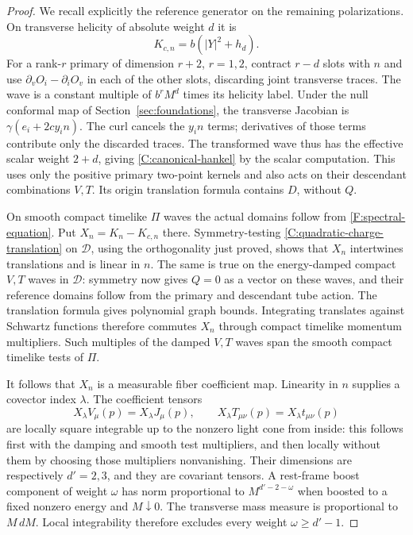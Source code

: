 \begin{proof}
We recall explicitly the reference generator on the remaining
polarizations. On transverse helicity of absolute weight $d$
it is
\begin{equation}\label{C:canonical-hankel}
 K_{c,n}=b(|Y|^2+h_d).
\end{equation}
For a rank-$r$ primary of dimension $r+2$, $r=1,2$, contract
$r-d$ slots with $n$ and use
$\partial_vO_i-\partial_iO_v$ in each of the other slots,
discarding joint transverse traces. The wave is a constant
multiple of $b^rM^d$ times its helicity label. Under the null
conformal map of Section~\ref{sec:foundations}, the transverse
Jacobian is $\gamma(e_i+2cy_i n)$. The curl cancels the
$y_i n$ terms; derivatives of those terms contribute only
the discarded traces. The transformed wave thus has the
effective scalar weight $2+d$, giving
\eqref{C:canonical-hankel} by the scalar computation. This
uses only the positive primary two-point kernels and also
acts on their descendant combinations $V,T$. Its origin
translation formula contains $D$, without $Q$.

On smooth compact timelike $\Pi$ waves the actual domains follow
from \eqref{F:spectral-equation}. Put
$X_n=K_n-K_{c,n}$ there. Symmetry-testing
\eqref{C:quadratic-charge-translation} on $\mathscr D$, using
the orthogonality just proved, shows that $X_n$ intertwines
translations and is linear in $n$. The same is true on the
energy-damped compact $V,T$ waves in $\mathscr D$: symmetry
now gives $Q=0$ as a vector on these waves, and their reference
domains follow from the primary and descendant tube action.
The translation formula gives polynomial graph bounds.
Integrating translates against Schwartz functions therefore
commutes $X_n$ through compact timelike momentum multipliers.
Such multiples of the damped $V,T$ waves span the smooth
compact timelike tests of $\Pi$.

It follows that $X_n$ is a measurable fiber coefficient map.
Linearity in $n$ supplies a covector index $\lambda$. The
coefficient tensors
\[
 X_\lambda V_\mu(p)=X_\lambda J_\mu(p),\qquad
 X_\lambda T_{\mu\nu}(p)=X_\lambda t_{\mu\nu}(p)
\]
are locally square integrable up to the nonzero light cone
from inside: this follows first with the damping and smooth
test multipliers, and then locally without them by choosing
those multipliers nonvanishing. Their dimensions are
respectively $d'=2,3$, and they are covariant tensors.
A rest-frame boost component of weight $\omega$ has norm
proportional to $M^{d'-2-\omega}$ when boosted to a fixed
nonzero energy and $M\downarrow0$. The transverse mass
measure is proportional to $M\,dM$. Local integrability
therefore excludes every weight $\omega\ge d'-1$.


\end{proof}
